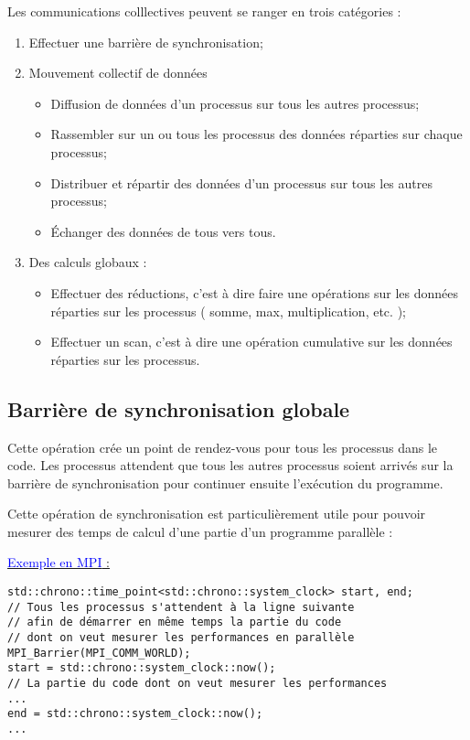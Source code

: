 \documentclass[fleqn,11pt]{article}
\begin{document}
Les communications colllectives peuvent se ranger en trois catégories :
\begin{enumerate}
\item Effectuer une barrière de synchronisation;
\item Mouvement collectif de données
  \begin{itemize}
  \item Diffusion de données d'un processus sur tous les autres processus;
  \item Rassembler sur un ou tous les processus des données réparties sur
  chaque processus;
  \item Distribuer et répartir des données d'un processus sur tous les autres 
  processus;
  \item \'Echanger des données de tous vers tous.
  \end{itemize}
\item Des calculs globaux :
  \begin{itemize}
  \item Effectuer des réductions, c'est à dire faire une opérations sur les données réparties
  sur les processus ( somme, max, multiplication, etc. );
  \item Effectuer un scan, c'est à dire une opération cumulative sur les données réparties
  sur les processus.
  \end{itemize}
\end{enumerate}

\subsection{Barrière de synchronisation globale}

Cette opération crée un point de rendez-vous pour tous les processus dans le code.
Les processus attendent que tous les autres processus soient arrivés sur la barrière
de synchronisation pour continuer ensuite l'exécution du programme.

Cette opération de synchronisation est particulièrement utile pour pouvoir mesurer
des temps de calcul d'une partie d'un programme parallèle :

\underline{\textcolor{blue}{Exemple en MPI} :}

\begin{lstlisting}
std::chrono::time_point<std::chrono::system_clock> start, end;
// Tous les processus s'attendent à la ligne suivante
// afin de démarrer en même temps la partie du code
// dont on veut mesurer les performances en parallèle
MPI_Barrier(MPI_COMM_WORLD);
start = std::chrono::system_clock::now();
// La partie du code dont on veut mesurer les performances
...
end = std::chrono::system_clock::now();
...
\end{lstlisting}
\end{document}
